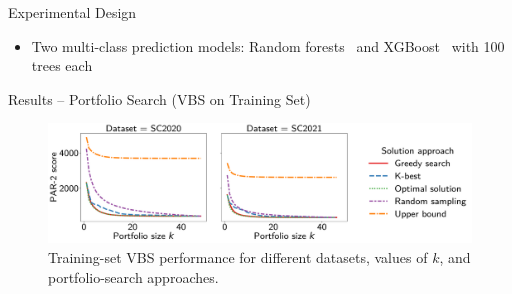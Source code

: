 \documentclass[en]{sdqbeamer}
\begin{document}
\begin{frame}[t]{Experimental Design}
\begin{itemize}
\begin{itemize}
		\end{itemize}
		\pause
		\vspace{\baselineskip}
		\item Two multi-class prediction models: Random forests~\cite{breiman2001random, scikit-learn} and XGBoost~\cite{xgboost} with 100 trees each
	\end{itemize}
\end{frame}

\begin{frame}[t]{Results -- Portfolio Search (VBS on Training Set)}
	\begin{figure}[htb]
		\centering
		\includegraphics[width=\textwidth]{plots/search-train-objective.pdf}
		\caption*{Training-set VBS performance for different datasets, values of $k$, and portfolio-search approaches.}

\end{figure}
\end{frame}
\end{document}
